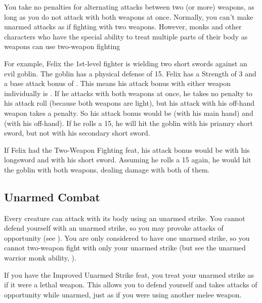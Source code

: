 You take no penalties for alternating attacks between two (or more) weapons, as long as you do not attack with both weapons at once. Normally, you can't make unarmed attacks as if fighting with two weapons. However, monks and other characters who have the special ability to treat multiple parts of their body as weapons can use two-weapon fighting

\par For example, Felix the 1st-level fighter is wielding two short swords against an evil goblin. The goblin has a physical defense of 15. Felix has a Strength of 3 and a base attack bonus of . This means his attack bonus with either weapon individually is . If he attacks with both weapons at once, he takes no penalty to his attack roll (because both weapons are light), but his attack with his off-hand weapon takes a  penalty. So his attack bonus would be  (with his main hand) and  (with his off-hand). If he rolls a 15, he will hit the goblin with his priamry short sword, but not with his secondary short sword.

\par If Felix had the Two-Weapon Fighting feat, his attack bonus would be  with his longsword and  with his short sword. Assuming he rolls a 15 again, he would hit the goblin with both weapons, dealing damage with both of them.

\subsection{Unarmed Combat}\label{Unarmed Combat}
Every creature can attack with its body using an unarmed strike. You cannot defend yourself with an unarmed strike, so you may provoke attacks of opportunity (see ). You are only considered to have one unarmed strike, so you cannot two-weapon fight with only your unarmed strike (but see the unarmed warrior monk ability, ).

If you have the Improved Unarmed Strike feat, you treat your unarmed strike as if it were a lethal weapon. This allows you to defend yourself and takes attacks of opportunity while unarmed, just as if you were using another melee weapon.
